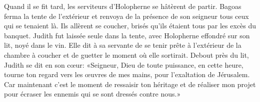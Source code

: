 Quand il se fit tard, les serviteurs d'Holopherne se hâtèrent de partir.
Bagoas ferma la tente de l'extérieur
	et renvoya de la présence de son seigneur tous ceux qui se tenaient là.
Ils allèrent se coucher, brisés qu'ils étaient tous par les excès du banquet.
Judith fut laissée seule dans la tente,
	avec Holopherne effondré sur son lit, noyé dans le vin.
Elle dit à sa servante de se tenir prête à l'extérieur de la chambre à coucher
	et de guetter le moment où elle sortirait.
Debout près du lit, Judith se dit en son cœur:
	«Seigneur, Dieu de toute puissance,
	en cette heure, tourne ton regard vers les œuvres de mes mains,
	pour l'exaltation de Jérusalem.
Car maintenant c'est le moment de ressaisir ton héritage et de réaliser mon projet
	pour écraser les ennemis qui se sont dressés contre nous.»
